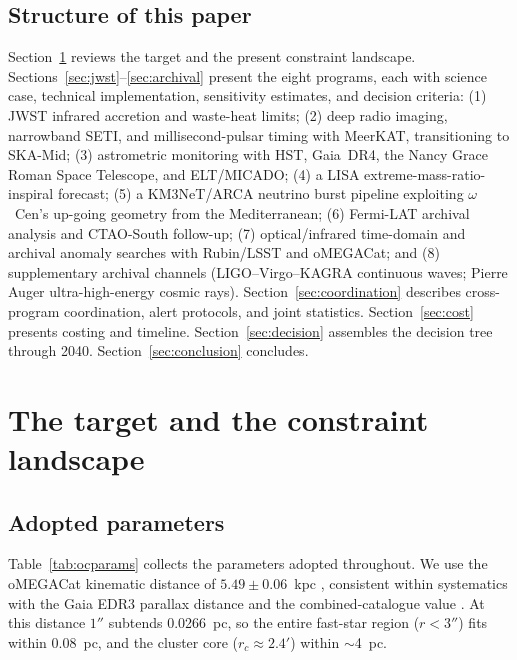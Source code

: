 \documentclass[11pt]{article}
\newcommand{\ocen}{\ensuremath{\omega}~Cen}
\begin{document}
\subsection{Structure of this paper}

Section~\ref{sec:target} reviews the target and the present constraint landscape. Sections~\ref{sec:jwst}--\ref{sec:archival} present the eight programs, each with science case, technical implementation, sensitivity estimates, and decision criteria: (1) JWST infrared accretion and waste-heat limits; (2) deep radio imaging, narrowband SETI, and millisecond-pulsar timing with MeerKAT, transitioning to SKA-Mid; (3) astrometric monitoring with HST, Gaia~DR4, the Nancy Grace Roman Space Telescope, and ELT/MICADO; (4) a LISA extreme-mass-ratio-inspiral forecast; (5) a KM3NeT/ARCA neutrino burst pipeline exploiting \ocen's up-going geometry from the Mediterranean; (6) Fermi-LAT archival analysis and CTAO-South follow-up; (7) optical/infrared time-domain and archival anomaly searches with Rubin/LSST and oMEGACat; and (8) supplementary archival channels (LIGO--Virgo--KAGRA continuous waves; Pierre Auger ultra-high-energy cosmic rays). Section~\ref{sec:coordination} describes cross-program coordination, alert protocols, and joint statistics. Section~\ref{sec:cost} presents costing and timeline. Section~\ref{sec:decision} assembles the decision tree through 2040. Section~\ref{sec:conclusion} concludes.

\section{The target and the constraint landscape}
\label{sec:target}

\subsection{Adopted parameters}

Table~\ref{tab:ocparams} collects the parameters adopted throughout. We use the oMEGACat kinematic distance of $5.49\pm0.06$~kpc \citep{Haberle2025oMEGACatVI}, consistent within systematics with the Gaia EDR3 parallax distance \citep{Soltis2021} and the combined-catalogue value \citep{BaumgardtVasiliev2021}. At this distance $1''$ subtends 0.0266~pc, so the entire fast-star region ($r < 3''$) fits within 0.08~pc, and the cluster core ($r_c \approx 2.4'$) within $\sim$4~pc.
\end{document}
